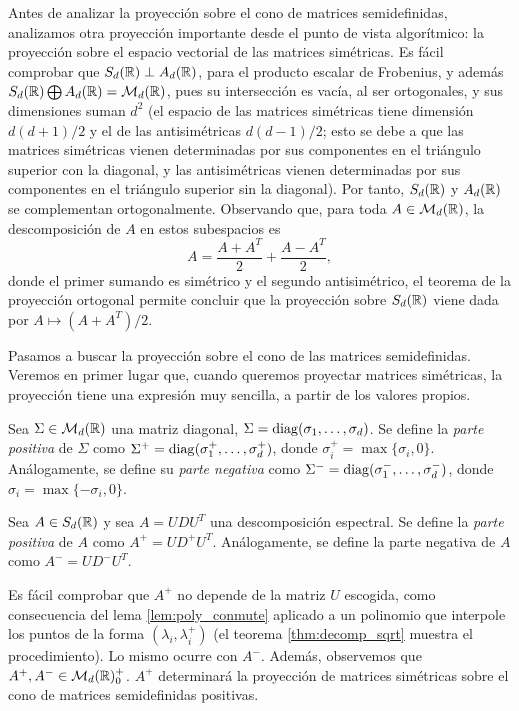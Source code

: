 Antes de analizar la proyección sobre el cono de matrices semidefinidas, analizamos otra proyección importante desde el punto de vista algorítmico: la proyección sobre el espacio vectorial de las matrices simétricas. Es fácil comprobar que $S_d(\mathbb{R}) \perp A_d(\mathbb{R})$, para el producto escalar de Frobenius, y además $S_d(\mathbb{R}) \bigoplus A_d(\mathbb{R}) = \mathcal{M}_d(\mathbb{R})$, pues su intersección es vacía, al ser ortogonales, y sus dimensiones suman $d^2$ (el espacio de las matrices simétricas tiene dimensión $d(d+1)/2$ y el de las antisimétricas $d(d-1)/2$; esto se debe a que las matrices simétricas vienen determinadas por sus componentes en el triángulo superior con la diagonal, y las antisimétricas vienen determinadas por sus componentes en el triángulo superior sin la diagonal). Por tanto, $S_d(\mathbb{R})$ y $A_d(\mathbb{R})$ se complementan ortogonalmente. Observando que, para toda $A \in \mathcal{M}_d(\mathbb{R})$, la descomposición de $A$ en estos subespacios es
\[ A = \frac{A + A^T}{2} + \frac{A - A^T}{2}, \]
donde el primer sumando es simétrico y el segundo antisimétrico, el teorema de la proyección ortogonal permite concluir que la proyección sobre $S_d(\mathbb{R})$ viene dada por $A \mapsto (A + A^T)/2$.

Pasamos a buscar la proyección sobre el cono de las matrices semidefinidas. Veremos en primer lugar que, cuando queremos proyectar matrices simétricas, la proyección tiene una expresión muy sencilla, a partir de los valores propios.

\begin{definition}
    Sea $\Sigma \in \mathcal{M}_d(\mathbb{R})$ una matriz diagonal, $\Sigma = \operatorname{diag}(\sigma_1,\dots,\sigma_d)$. Se define la \emph{parte positiva} de $\Sigma$ como $\Sigma^+ = \operatorname{diag}(\sigma_1^+,\dots,\sigma_d^+)$, donde $\sigma_i^+ = \max\{\sigma_i,0\}$. Análogamente, se define su \emph{parte negativa} como $\Sigma^- = \operatorname{diag}(\sigma_1^-,\dots,\sigma_d^-)$, donde $\sigma_i = \max\{-\sigma_i,0\}$.

    Sea $A \in S_d(\mathbb{R})$ y sea $A = UDU^T$ una descomposición espectral. Se define la \emph{parte positiva} de $A$ como $A^+ = UD^+U^T$. Análogamente, se define la parte negativa de $A$ como $A^- = UD^-U^T$.
\end{definition}

Es fácil comprobar que $A^+$ no depende de la matriz $U$ escogida, como consecuencia del lema \ref{lem:poly_conmute} aplicado a un polinomio que interpole los puntos de la forma $(\lambda_i,\lambda_i^+)$ (el teorema \ref{thm:decomp_sqrt} muestra el procedimiento). Lo mismo ocurre con $A^-$. Además, observemos que $A^+, A^- \in \mathcal{M}_d(\mathbb{R})^+_0$. $A^+$ determinará la proyección de matrices simétricas sobre el cono de matrices semidefinidas positivas.


